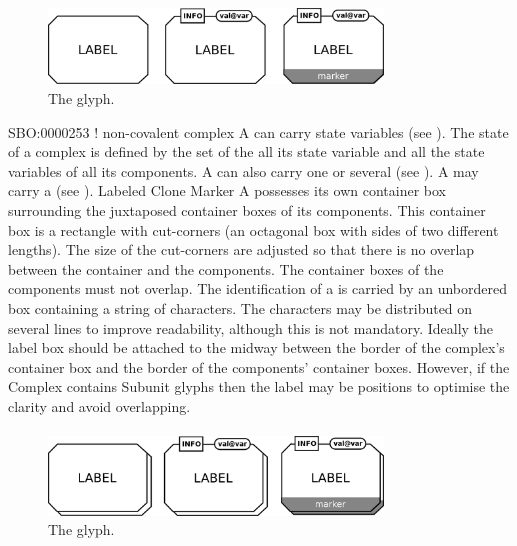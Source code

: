 \paragraph{}

\begin{figure}[H]
  \centering
  \includegraphics[width=3.5in]{images/complexGlyph}
  \caption{The  glyph.}
  \label{fig:complex}
\end{figure}

\begin{glyphDescription}
\glyphSboTerm SBO:0000253 ! non-covalent complex
\glyphAux A  can carry state variables (see ).  The state of a complex is defined by the set of the all its state variable and all the state variables of all its components.  A  can also carry one or several  (see ). A  may carry a  (see ).
\glyphCloning Labeled Clone Marker
\glyphContainer A  possesses its own container box surrounding the juxtaposed container boxes of its components.  This container box is a rectangle with cut-corners (an octagonal box with sides of two different lengths).  The size of the cut-corners are adjusted so that there is no overlap between the container and the components.  The container boxes of the components must not overlap.
\glyphLabel The identification of a  is carried
by an unbordered box containing a string of characters.  The
characters may be distributed on several lines to improve readability,
although this is not mandatory.  Ideally the label box should be
attached to the midway between the border of the complex's container
box and the border of the components' container boxes. However, if the
Complex contains Subunit glyphs then the label may be positions to
optimise the clarity and avoid overlapping.
\end{glyphDescription}


\paragraph{}

\begin{figure}[H]
  \centering
  \includegraphics[width = 3.5in]{images/complexMultimerGlyph}
  \caption{The  glyph.}
  \label{fig:complexMultimer}
\end{figure}

